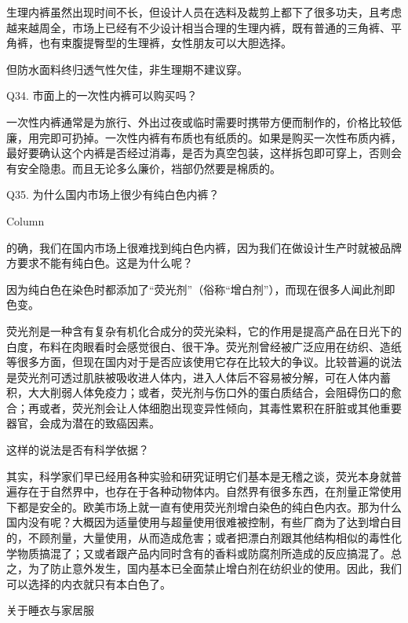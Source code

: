 \documentclass[12pt,UTF8]{ctexbook}
\begin{document}
生理内裤虽然出现时间不长，但设计人员在选料及裁剪上都下了很多功夫，且考虑越来越周全，市场上已经有不少设计相当合理的生理内裤，既有普通的三角裤、平角裤，也有束腹提臀型的生理裤，女性朋友可以大胆选择。

但防水面料终归透气性欠佳，非生理期不建议穿。





Q34. 市面上的一次性内裤可以购买吗？


一次性内裤通常是为旅行、外出过夜或临时需要时携带方便而制作的，价格比较低廉，用完即可扔掉。一次性内裤有布质也有纸质的。如果是购买一次性布质内裤，最好要确认这个内裤是否经过消毒，是否为真空包装，这样拆包即可穿上，否则会有安全隐患。而且无论多么廉价，裆部仍然要是棉质的。





Q35. 为什么国内市场上很少有纯白色内裤？



Column

的确，我们在国内市场上很难找到纯白色内裤，因为我们在做设计生产时就被品牌方要求不能有纯白色。这是为什么呢？

因为纯白色在染色时都添加了“荧光剂”（俗称“增白剂”），而现在很多人闻此剂即色变。

荧光剂是一种含有复杂有机化合成分的荧光染料，它的作用是提高产品在日光下的白度，布料在肉眼看时会感觉很白、很干净。荧光剂曾经被广泛应用在纺织、造纸等很多方面，但现在国内对于是否应该使用它存在比较大的争议。比较普遍的说法是荧光剂可透过肌肤被吸收进人体内，进入人体后不容易被分解，可在人体内蓄积，大大削弱人体免疫力；或者，荧光剂与伤口外的蛋白质结合，会阻碍伤口的愈合；再或者，荧光剂会让人体细胞出现变异性倾向，其毒性累积在肝脏或其他重要器官，会成为潜在的致癌因素。

这样的说法是否有科学依据？

其实，科学家们早已经用各种实验和研究证明它们基本是无稽之谈，荧光本身就普遍存在于自然界中，也存在于各种动物体内。自然界有很多东西，在剂量正常使用下都是安全的。欧美市场上就一直有使用荧光剂增白染色的纯白色内衣。那为什么国内没有呢？大概因为适量使用与超量使用很难被控制，有些厂商为了达到增白目的，不顾剂量，大量使用，从而造成危害；或者把漂白剂跟其他结构相似的毒性化学物质搞混了；又或者跟产品内同时含有的香料或防腐剂所造成的反应搞混了。总之，为了防止意外发生，国内基本已全面禁止增白剂在纺织业的使用。因此，我们可以选择的内衣就只有本白色了。





关于睡衣与家居服
\end{document}
